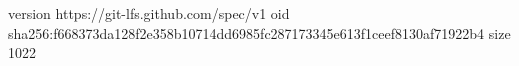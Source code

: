 version https://git-lfs.github.com/spec/v1
oid sha256:f668373da128f2e358b10714dd6985fc287173345e613f1ceef8130af71922b4
size 1022
